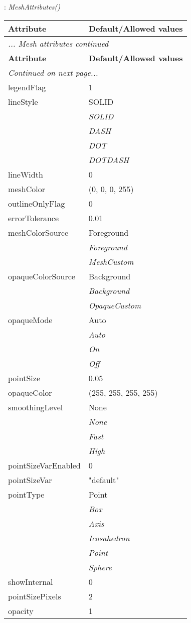 \documentclass[10pt,a4paper]{report}
\begin{document}
\newpage

{}
: {\it MeshAttributes() }\\[-3mm]

\begin{longtable}{ll}
{\bf Attribute} & {\bf Default/Allowed values} \\
\hline \hline
\endfirsthead
\multicolumn{2}{l}{{\it ... Mesh attributes continued}} \\
{\bf Attribute} & {\bf Default/Allowed values} \\
\hline \hline
\endhead
\hline
\multicolumn{2}{l}{{\it Continued on next page...}} \\
\endfoot
\hline
\endlastfoot

legendFlag  &  1 \\
lineStyle  &  SOLID   \\
 & {\it  SOLID} \\
 & {\it  DASH} \\
 & {\it  DOT} \\
 & {\it  DOTDASH} \\
lineWidth  &  0 \\
meshColor  &  (0, 0, 0, 255) \\
outlineOnlyFlag  &  0 \\
errorTolerance  &  0.01 \\
meshColorSource  &  Foreground   \\
 & {\it  Foreground} \\
 & {\it  MeshCustom} \\
opaqueColorSource  &  Background   \\
 & {\it  Background} \\
 & {\it  OpaqueCustom} \\
opaqueMode  &  Auto   \\
 & {\it  Auto} \\
 & {\it  On} \\
 & {\it  Off} \\
pointSize  &  0.05 \\
opaqueColor  &  (255, 255, 255, 255) \\
smoothingLevel  &  None   \\
 & {\it  None} \\
 & {\it  Fast} \\
 & {\it  High} \\
pointSizeVarEnabled  &  0 \\
pointSizeVar  &  "default" \\
pointType  &  Point   \\
 & {\it  Box} \\
 & {\it  Axis} \\
 & {\it  Icosahedron} \\
 & {\it  Point} \\
 & {\it  Sphere} \\
showInternal  &  0 \\
pointSizePixels  &  2 \\
opacity  &  1 \\
\end{longtable}
\end{document}
